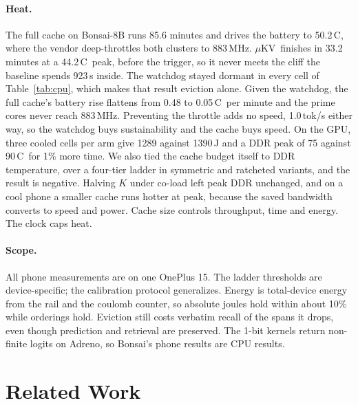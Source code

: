 \documentclass[sigconf, anonymous=false, screen=true, 10pt]{acmart}
\newcommand{\muKV}{$\mu$KV}
\newcommand{\C}{\,\textdegree C}
\begin{document}
\paragraph{Heat.} The full cache on Bonsai-8B runs 85.6 minutes and drives the battery to 50.2\C, where the vendor deep-throttles both clusters to 883\,MHz. \muKV\ finishes in 33.2 minutes at a 44.2\C\ peak, before the trigger, so it never meets the cliff the baseline spends 923\,s inside. The watchdog stayed dormant in every cell of Table~\ref{tab:cpu}, which makes that result eviction alone. Given the watchdog, the full cache's battery rise flattens from 0.48 to 0.05\C\ per minute and the prime cores never reach 883\,MHz. Preventing the throttle adds no speed, 1.0\,tok/s either way, so the watchdog buys sustainability and the cache buys speed. On the GPU, three cooled cells per arm give 1289 against 1390\,J and a DDR peak of 75 against 90\C\ for 1\% more time. We also tied the cache budget itself to DDR temperature, over a four-tier ladder in symmetric and ratcheted variants, and the result is negative. Halving $K$ under co-load left peak DDR unchanged, and on a cool phone a smaller cache runs hotter at peak, because the saved bandwidth converts to speed and power. Cache size controls throughput, time and energy. The clock caps heat.

\paragraph{Scope.} All phone measurements are on one OnePlus 15. The ladder thresholds are device-specific; the calibration protocol generalizes. Energy is total-device energy from the rail and the coulomb counter, so absolute joules hold within about 10\% while orderings hold. Eviction still costs verbatim recall of the spans it drops, even though prediction and retrieval are preserved. The 1-bit kernels return non-finite logits on Adreno, so Bonsai's phone results are CPU results.

\section{Related Work}
\label{sec:related}
\end{document}
